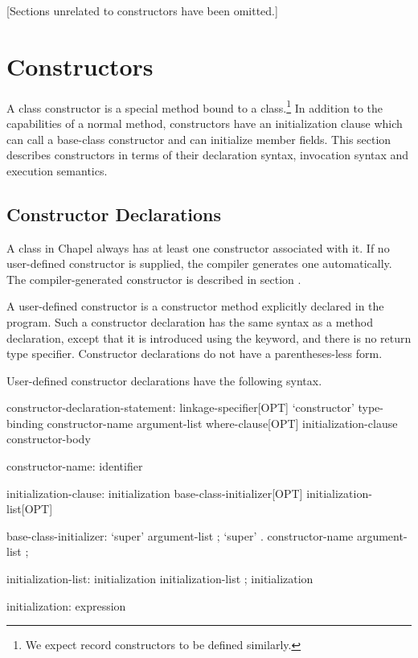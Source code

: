 

\label{Classes}

[Sections unrelated to constructors have been omitted.]

\section{Constructors}
\label{Constructors}

A class constructor is a special method bound to a class.\footnote{We expect
record constructors to be defined similarly.}  In addition to
the capabilities of a normal method, constructors have an initialization clause
which can call a base-class constructor and can initialize member fields.  This
section describes constructors in terms of their declaration syntax, invocation
syntax and execution semantics.  

\subsection{Constructor Declarations}
\label{Constructor_Declarations}

A class in Chapel always has at least one constructor associated with it.  If no
user-defined constructor is supplied, the compiler generates one automatically.
The compiler-generated constructor is described in section .

A user-defined constructor is a constructor method explicitly declared
in the program.  Such a constructor declaration has the same
syntax as a method declaration, except that it is introduced using
the  keyword, and there is no return type specifier.
Constructor declarations do not have a parentheses-less form.

User-defined constructor declarations have the following syntax.
\begin{syntax}
constructor-declaration-statement:
  linkage-specifier[OPT] `constructor' type-binding constructor-name argument-list 
    where-clause[OPT] initialization-clause constructor-body

constructor-name:
  identifier

initialization-clause:
  initialization
  { base-class-initializer[OPT] initialization-list[OPT] }

base-class-initializer:
  `super' argument-list ;
  `super' . constructor-name argument-list ;

initialization-list:
  initialization
  initialization-list ; initialization

initialization:
  expression

\end{syntax}


